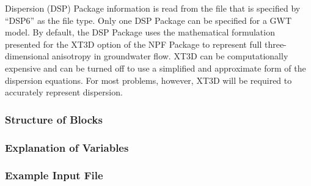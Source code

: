 Dispersion (DSP) Package information is read from the file that is specified by ``DSP6'' as the file type.  Only one DSP Package can be specified for a GWT model.  By default, the DSP Package uses the mathematical formulation presented for the XT3D option of the NPF Package to represent full three-dimensional anisotropy in groundwater flow.  XT3D can be computationally expensive and can be turned off to use a simplified and approximate form of the dispersion equations.  For most problems, however, XT3D will be required to accurately represent dispersion.

\vspace{5mm}
\subsubsection{Structure of Blocks}



\vspace{5mm}
\subsubsection{Explanation of Variables}
\begin{description}

\end{description}

\vspace{5mm}
\subsubsection{Example Input File}


